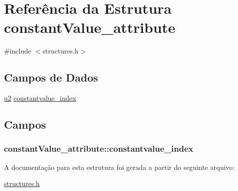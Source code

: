 \hypertarget{structconstantValue__attribute}{}\section{Referência da Estrutura constant\+Value\+\_\+attribute}
\label{structconstantValue__attribute}


{\ttfamily \#include $<$structures.\+h$>$}

\subsection*{Campos de Dados}
\begin{DoxyCompactItemize}
\item 
\hyperlink{lista__operandos_8h_a732cde1300aafb73b0ea6c2558a7a54f}{u2} \hyperlink{structconstantValue__attribute_a08104752941d024731797a40dbd2d79d}{constantvalue\+\_\+index}
\end{DoxyCompactItemize}


\subsection{Campos}
\subsubsection[{\texorpdfstring{constantvalue\+\_\+index}{constantvalue_index}}]{ constant\+Value\+\_\+attribute\+::constantvalue\+\_\+index}\hypertarget{structconstantValue__attribute_a08104752941d024731797a40dbd2d79d}{}\label{structconstantValue__attribute_a08104752941d024731797a40dbd2d79d}


A documentação para esta estrutura foi gerada a partir do seguinte arquivo\+:\begin{DoxyCompactItemize}
\item 
\hyperlink{structures_8h}{structures.\+h}\end{DoxyCompactItemize}
